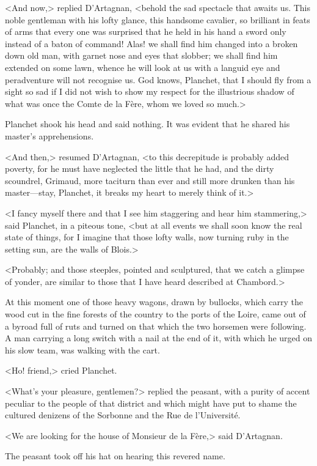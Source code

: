<And now,> replied D'Artagnan, <behold the sad spectacle that awaits us. This noble gentleman with his lofty glance, this handsome cavalier, so brilliant in feats of arms that every one was surprised that he held in his hand a sword only instead of a baton of command! Alas! we shall find him changed into a broken down old man, with garnet nose and eyes that slobber; we shall find him extended on some lawn, whence he will look at us with a languid eye and peradventure will not recognise us. God knows, Planchet, that I should fly from a sight so sad if I did not wish to show my respect for the illustrious shadow of what was once the Comte de la Fère, whom we loved so much.>

Planchet shook his head and said nothing. It was evident that he shared his master's apprehensions.

<And then,> resumed D'Artagnan, <to this decrepitude is probably added poverty, for he must have neglected the little that he had, and the dirty scoundrel, Grimaud, more taciturn than ever and still more drunken than his master—stay, Planchet, it breaks my heart to merely think of it.>

<I fancy myself there and that I see him staggering and hear him stammering,> said Planchet, in a piteous tone, <but at all events we shall soon know the real state of things, for I imagine that those lofty walls, now turning ruby in the setting sun, are the walls of Blois.>

<Probably; and those steeples, pointed and sculptured, that we catch a glimpse of yonder, are similar to those that I have heard described at Chambord.>

At this moment one of those heavy wagons, drawn by bullocks, which carry the wood cut in the fine forests of the country to the ports of the Loire, came out of a byroad full of ruts and turned on that which the two horsemen were following. A man carrying a long switch with a nail at the end of it, with which he urged on his slow team, was walking with the cart.

<Ho! friend,> cried Planchet.

<What's your pleasure, gentlemen?> replied the peasant, with a purity of accent peculiar to the people of that district and which might have put to shame the cultured denizens of the Sorbonne and the Rue de l'Université.

<We are looking for the house of Monsieur de la Fère,> said D'Artagnan.

The peasant took off his hat on hearing this revered name.

